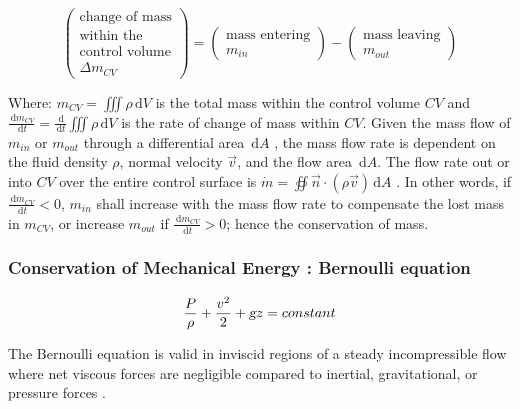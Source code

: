 \documentclass{article}
\newcommand{\ud}{\,\mathrm{d}}
\begin{document}
\begin{equation}
\left(
    \begin{array}{c}
        \textrm{change of mass} \\
        \textrm{within the} \\
        \textrm{control volume} \\
        \Delta m_{CV}
    \end{array}
\right) = \left(
    \begin{array}{c}
        \textrm{mass entering} \\
        m_{in}
    \end{array}
\right) - \left(
    \begin{array}{c}
        \textrm{mass leaving} \\
        m_{out}
    \end{array}
\right)
\label{fig_changeOfMass}
\end{equation}

Where: $\displaystyle m_{CV} = \iiint \rho \ud V$ is the total mass within the control volume $CV$ and $\displaystyle \frac{\ud m_{CV}}{\ud t} = \frac{\ud}{\ud t} \iiint \rho \ud V$ is the rate of change of mass within $CV$. Given the mass flow of $m_{in}$ or $m_{out}$ through a differential area $\ud A$ , the mass flow rate is dependent on the fluid density $\rho$, normal velocity $\vec{v}$, and the flow area $\ud A$. The flow rate out or into $CV$ over the entire control surface is $\displaystyle \dot{m} = \oiint \vec{n} \cdot (\rho \vec{v}) \ud A$ \cite{White2011}. In other words, if $\displaystyle \frac{\ud m_{CV}}{\ud t} < 0$, $m_{in}$ shall increase with the mass flow rate to compensate the lost mass in $m_{CV}$, or increase $m_{out}$ if $\displaystyle \frac{\ud m_{CV}}{\ud t} > 0$; hence the conservation of mass.

\subsubsection*{Conservation of Mechanical Energy : Bernoulli equation}

\begin{equation}
\frac{P}{\rho} + \frac{v^2}{2} + \textsl{g} z = constant
\label{eq_bernoulliSteadyIncompressible}
\end{equation}

The Bernoulli equation is valid in inviscid regions of a steady incompressible flow where net viscous forces are negligible compared to inertial, gravitational, or pressure forces \cite{White2011}.
\end{document}
